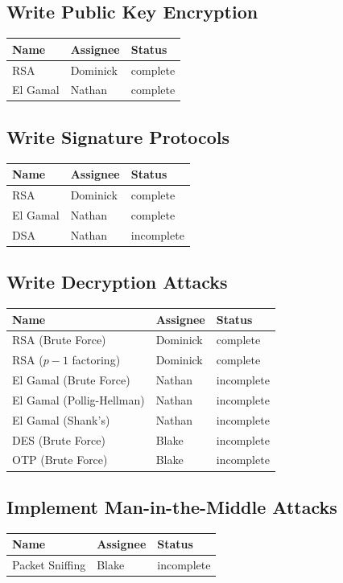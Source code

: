 \documentclass[12pt]{report}
\begin{document}
    \subsection{Write Public Key Encryption}
    \begin{tabular}{l|l|l}
        Name & Assignee & Status \\ \hline
        RSA & Dominick & complete \\
        El Gamal & Nathan & complete
    \end{tabular}

    \subsection{Write Signature Protocols}
    \begin{tabular}{l|l|l}
        Name & Assignee & Status \\ \hline
        RSA & Dominick & complete \\
        El Gamal & Nathan & complete \\
        DSA & Nathan & incomplete
    \end{tabular}

    \subsection{Write Decryption Attacks}
    \begin{tabular}{l|l|l}
        Name & Assignee & Status \\ \hline
        RSA (Brute Force) & Dominick & complete \\
        RSA ($p-1$ factoring) & Dominick & complete \\
        El Gamal (Brute Force) & Nathan & incomplete \\
        El Gamal (Pollig-Hellman) & Nathan & incomplete \\
        El Gamal (Shank's) & Nathan & incomplete \\
        DES (Brute Force) & Blake & incomplete \\
        OTP (Brute Force) & Blake & incomplete
    \end{tabular}

    \subsection{Implement Man-in-the-Middle Attacks}
    \begin{tabular}{l|l|l}
        Name & Assignee & Status \\ \hline
        Packet Sniffing & Blake & incomplete
    \end{tabular}
\end{document}
